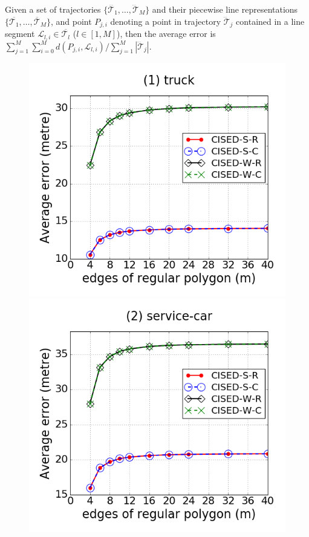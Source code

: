 Given a set of trajectories $\{\dddot{\mathcal{T}_1}, \ldots, \dddot{\mathcal{T}}_M\}$ and their piecewise line representations $\{\overline{\mathcal{T}_1}, \ldots, \overline{\mathcal{T}}_M\}$, and point $P_{j,i}$ denoting
a point in trajectory $\dddot{\mathcal{T}}_j$ contained in a line segment $\mathcal{L}_{l,i}\in\overline{\mathcal{T}_l}$ ($l\in[1,M]$),
then the average error is $\sum_{j=1}^{M}\sum_{i=0}^{M} d(P_{j,i},
\mathcal{L}_{l,i})/\sum_{j=1}^{M}{|\dddot{\mathcal{T}}_j |}$.




\begin{figure}[tb!]
\centering
\includegraphics[scale = 0.250]{figures/Exp-M-e-60-error-truck.png}
\includegraphics[scale = 0.250]{figures/Exp-M-e-60-error-service.png}

\end{figure}
